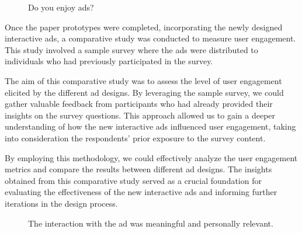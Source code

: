 \documentclass[journal]{IEEEtran}
\begin{document}
\clearpage

\begin{figure}[ht]
    \centering
    \caption{Do you enjoy ads?}
\end{figure}

Once the paper prototypes were completed, incorporating the newly designed interactive
ads, a comparative study was conducted to measure user engagement. This study involved
a sample survey where the ads were distributed to individuals who had previously
participated in the survey.

The aim of this comparative study was to assess the level of user engagement elicited
by the different ad designs. By leveraging the sample survey, we could gather valuable
feedback from participants who had already provided their insights on the survey
questions. This approach allowed us to gain a deeper understanding of how the new
interactive ads influenced user engagement, taking into consideration the respondents'
prior exposure to the survey content.

By employing this methodology, we could effectively analyze the user engagement metrics
and compare the results between different ad designs. The insights obtained from this
comparative study served as a crucial foundation for evaluating the effectiveness of
the new interactive ads and informing further iterations in the design process.

\begin{figure}[ht]
    \centering
    \caption{The interaction with the ad was meaningful and personally relevant. }
\end{figure}
\end{document}

